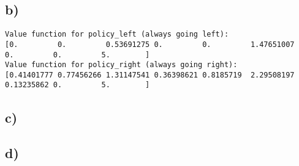 \documentclass[a4paper]{article}
\begin{document}
\subsection*{b)}

\begin{lstlisting}
Value function for policy_left (always going left):
[0.         0.         0.53691275 0.         0.         1.47651007
0.         0.         5.        ]
Value function for policy_right (always going right):
[0.41401777 0.77456266 1.31147541 0.36398621 0.8185719  2.29508197
0.13235862 0.         5.        ]
\end{lstlisting}

\subsection*{c)}


\subsection*{d)}
\end{document}
